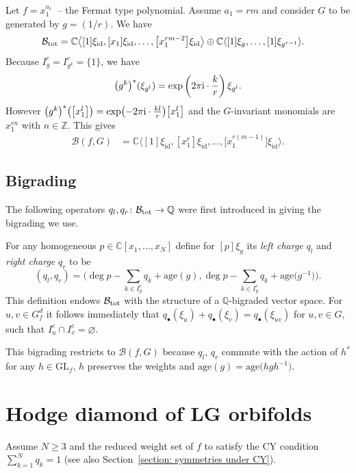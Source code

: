 \documentclass[pdftex]{sigma}
\numberwithin{equation}{section}
\newcommand{\CC}{{\mathbb{C}}}
\newcommand{\QQ}{{\mathbb{Q}}}
\newcommand{\ZZ}{{\mathbb{Z}}}
\newcommand{\GL}{{\mathrm{GL}}}
\newcommand{\id}{\mathrm{id}}
\newcommand{\age}{\mathrm{age}}
\def\B{{\mathcal B}}
\begin{document}
\begin{Example}\label{example: Fermat type state space}
	Let $f = x_1^{a_1}$~-- the Fermat type polynomial. Assume $a_1 = rm$ and consider $G$ to be generated by $g = (1/r)$. We have
	\begin{align*}
		\B_{\rm tot} &= \CC \bigl\langle [1]\xi_{\id}, [x_1]\xi_{\id}, \dots,\bigl[x_1^{rm-2}\bigr] \xi_\id \bigr\rangle \oplus \CC\langle [1]\xi_{g},\dots,[1]\xi_{g^{r-1}} \rangle.
	\end{align*}
	Because $I_g^c = I_{g^k}^c = \{1\}$, we have
	\[
		 \bigl(g^k \bigr)^*(\xi_{g^l}) = \exp\left( 2 \pi {\rm i} \cdot \frac{k}{r}\right) \xi_{g^l}.
	\]
	However $\bigl(g^k\bigr)^*\bigl(\bigl[x_1^l\bigr]\bigr) = \exp\bigl(-2 \pi {\rm i} \cdot \frac{kl}{r}\bigr) \bigl[x_1^l\bigr]$ and the $G$-invariant monomials are $x_1^{rn}$ with $n \in \ZZ$. This gives
	\begin{align*}
		\B(f,G) &= \CC \bigl\langle [1]\xi_{\id},[x_1^r]\xi_{\id}, \dots, \bigl[x_1^{r(m-1)}\bigr]\xi_{\id}\bigr\rangle.
	\end{align*}
\end{Example}

\subsection{Bigrading}\label{section: bigrading}
The following operators $q_l, q_r \colon \B_{\rm tot} \to \QQ$ were first introduced in \cite{IV90} giving the bigrading we use.

For any homogeneous $p \in \CC[x_1,\dots,x_N]$ define for $[p]\xi_g$ its {\itshape left charge} $q_l$ and {\itshape right charge} $q_r$ to be
\begin{equation}\label{eq: left right charges}
 (q_l, q_r) = \biggl(\deg p - \sum_{k \in I_g^c} q_{k} + \age{(g)}, \deg p - \sum_{k \in I_g^c} q_{k} + \age{\bigl(g^{-1}\bigr)} \biggr).
\end{equation}
This definition endows $\B_{\rm tot}$ with the structure of a $\QQ$-bigraded vector space.
For $u,v\in G_f^d$ it follows immediately that $q_\bullet (\xi_u) + q_\bullet (\xi_v) = q_\bullet (\xi_{uv})$ for $u,v\in G$, such that $I_u^c \cap I_v^c = \varnothing$.

This bigrading restricts to $\B(f,G)$ because $q_l$, $q_r$ commute with the action of $h^\ast$ for any $h \in \GL_f$, $h$ preserves the weights and $\age(g)=\age\bigl(hgh^{-1}\bigr)$.

\section{Hodge diamond of LG orbifolds}
Assume $N \ge 3$ and the reduced weight set of $f$ to satisfy the CY condition ${\sum_{k=1}^N q_k = 1}$ (see also Section~\ref{section: symmetries under CY}).
\end{document}
